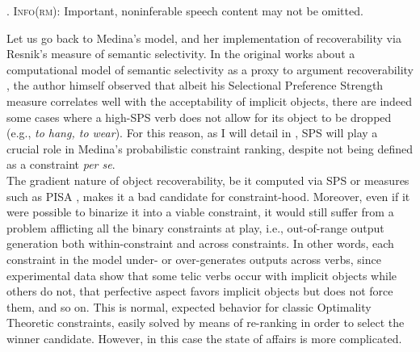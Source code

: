 \ex. \label{yankes-info} \textsc{Info(rm)}: Important, noninferable speech content may not be omitted.

Let us go back to Medina's model, and her implementation of recoverability via Resnik's measure of semantic selectivity. In the original works about a computational model of semantic selectivity as a proxy to argument recoverability \parencite{Resnik1993, Resnik1996}, the author himself observed that albeit his Selectional Preference Strength measure correlates well with the acceptability of implicit objects, there are indeed some cases where a high-SPS verb does not allow for its object to be dropped (e.g., \textit{to hang, to wear}). For this reason, as I will detail in , SPS will play a crucial role in Medina's probabilistic constraint ranking, despite not being defined as a constraint \textit{per se}.\\
The gradient nature of object recoverability, be it computed via SPS \parencite{Resnik1993, Resnik1996} or measures such as PISA \parencite{CappelliLenciPISA}, makes it a bad candidate for constraint-hood. Moreover, even if it were possible to binarize it into a viable constraint, it would still suffer from a problem afflicting all the binary constraints at play, i.e., out-of-range output generation both within-constraint and across constraints. In other words, each constraint in the model under- or over-generates outputs across verbs, since experimental data show that some telic verbs occur with implicit objects while others do not, that perfective aspect favors implicit objects but does not force them, and so on. This is normal, expected behavior for classic Optimality Theoretic constraints, easily solved by means of re-ranking in order to select the winner candidate. However, in this case the state of affairs is more complicated.\\
